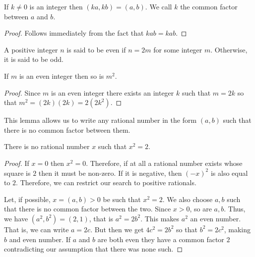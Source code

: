 \begin{lem}\label{c3s4l1}
If $k \ne 0$ is an integer then $(ka, kb) = (a, b)$. We call $k$ the 
common factor between $a$ and $b$.
\end{lem}
\begin{proof}
Follows immediately from the fact that $kab = kab$.
\end{proof}

\begin{defn}\label{c3s4d2}
A positive integer $n$ is said to be even if $n = 2m$ for some integer 
$m$. Otherwise, it is said to be odd.
\end{defn}

\begin{lem}\label{c3s4l2}
If $m$ is an even integer then so is $m^2$.
\end{lem}
\begin{proof}
Since $m$ is an even integer there exists an integer $k$ such that $m = 
2k$ so that $m^2 = (2k)(2k) = 2(2k^2)$.
\end{proof}

This lemma allows us to write any rational number in the form $(a, b)$
such that there is no common factor between them.

\begin{prop}\label{c3s4p3}
There is no rational number $x$ such that $x^2 = 2$.
\end{prop}
\begin{proof}
If $x = 0$ then $x^2 = 0$. Therefore, if at all a rational number exists
whose square is $2$ then it must be non-zero. If it is negative, then
$(-x)^2$ is also equal to $2$. Therefore, we can restrict our search to
positive rationals. 

Let, if possible, $x = (a, b) > 0$ be such that $x^2 = 2$. We also choose
$a, b$ such that there is no common factor between the two. Since $x > 0$,
so are $a, b$. Thus, we have $(a^2, b^2) = (2, 1)$, that is $a^2 = 2b^2$.
This makes $a^2$ an even number. That is, we can write $a = 2c$. But then
we get $4c^2 = 2b^2$ so that $ b^2 = 2c^2$, making $b$ and even number.
If $a$ and $b$ are both even they have a common factor $2$ contradicting
our assumption that there was none such.
\end{proof}

